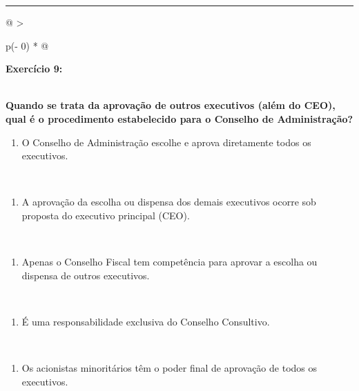 \documentclass[
]{book}
\providecommand{\tightlist}{%
  \setlength{\itemsep}{0pt}\setlength{\parskip}{0pt}}
\begin{document}
\begin{center}\rule{0.5\linewidth}{0.5pt}\end{center}

\begin{longtable}[]{@{}
  >{\raggedright\arraybackslash}p{(\columnwidth - 0\tabcolsep) * }@{}}
\toprule\noalign{}
\begin{minipage}[b]{\linewidth}\raggedright
\textbf{Exercício 9:}
\end{minipage} \\
\midrule\noalign{}
\endhead
\bottomrule\noalign{}
\endlastfoot
\textbf{Quando se trata da aprovação de outros executivos (além do CEO), qual é o procedimento estabelecido para o Conselho de Administração?} \\
\begin{minipage}[t]{\linewidth}\raggedright
\begin{enumerate}
\def\labelenumi{\alph{enumi})}
\tightlist
\item
  O Conselho de Administração escolhe e aprova diretamente todos os executivos.
\end{enumerate}
\end{minipage} \\
\begin{minipage}[t]{\linewidth}\raggedright
\begin{enumerate}
\def\labelenumi{\alph{enumi})}
\setcounter{enumi}{1}
\tightlist
\item
  A aprovação da escolha ou dispensa dos demais executivos ocorre sob proposta do executivo principal (CEO).
\end{enumerate}
\end{minipage} \\
\begin{minipage}[t]{\linewidth}\raggedright
\begin{enumerate}
\def\labelenumi{\alph{enumi})}
\setcounter{enumi}{2}
\tightlist
\item
  Apenas o Conselho Fiscal tem competência para aprovar a escolha ou dispensa de outros executivos.
\end{enumerate}
\end{minipage} \\
\begin{minipage}[t]{\linewidth}\raggedright
\begin{enumerate}
\def\labelenumi{\alph{enumi})}
\setcounter{enumi}{3}
\tightlist
\item
  É uma responsabilidade exclusiva do Conselho Consultivo.
\end{enumerate}
\end{minipage} \\
\begin{minipage}[t]{\linewidth}\raggedright
\begin{enumerate}
\def\labelenumi{\alph{enumi})}
\setcounter{enumi}{4}
\tightlist
\item
  Os acionistas minoritários têm o poder final de aprovação de todos os executivos.
\end{enumerate}
\end{minipage} \\
\end{longtable}
\end{document}
